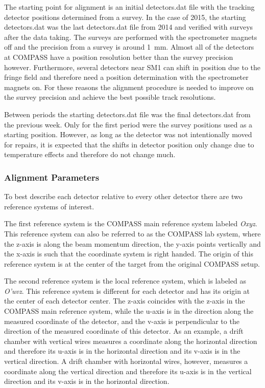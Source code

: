 The starting point for alignment is an initial detectors.dat file with the
tracking detector positions determined from a survey.  In the case of 2015, the
starting detectors.dat was the last detectors.dat file from 2014 and verified
with surveys after the data taking.  The surveys are performed with the
spectrometer magnets off and the precision from a survey is around 1~mm.  Almost
all of the detectors at COMPASS have a position resolution better than the
survey precision however.  Furthermore, several detectors near SM1 can shift in
position due to the fringe field and therefore need a position determination
with the spectrometer magnets on.  For these reasons the alignment procedure is
needed to improve on the survey precision and achieve the best possible track
resolutions.

Between periods the starting detectors.dat file was the final detectors.dat from
the previous week.  Only for the first period were the survey positions used as
a starting position.  However, as long as the detector was not intentionally
moved for repairs, it is expected that the shifts in detector position only
change due to temperature effects and therefore do not change much.

\subsubsection{Alignment Parameters}

To best describe each detector relative to every other detector there are two
reference systems of interest.

The first reference system is the COMPASS main reference system labeled
\textit{Oxyz}.  This reference system can also be referred to as the COMPASS lab
system, where the z-axis is along the beam momentum direction, the y-axis points
vertically and the x-axis is such that the coordinate system is right handed.
The origin of this reference system is at the center of the target from the
original COMPASS setup.

The second reference system is the local reference system, which is labeled as
\textit{O'uvz}.  This reference system is different for each detector and has
its origin at the center of each detector center.  The z-axis coincides with the
z-axis in the COMPASS main reference system, while the u-axis is in the
direction along the measured coordinate of the detector, and the v-axis is
perpendicular to the direction of the measured coordinate of this detector.  As
an example, a drift chamber with vertical wires measures a coordinate along the
horizontal direction and therefore its u-axis is in the horizontal direction
and its v-axis is in the vertical direction.  A drift chamber with horizontal
wires, however, measures a coordinate along the vertical direction and therefore
its u-axis is in the vertical direction and its v-axis is in the horizontal
direction.

